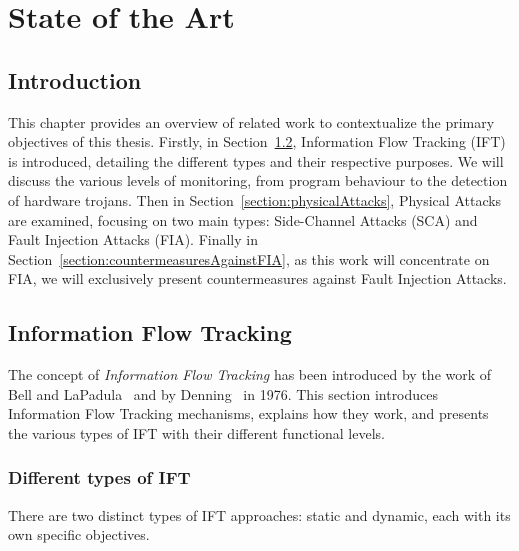 \chapter{State of the Art}
\label{chapter:soa}
\minitoc

\section{Introduction}
This chapter provides an overview of related work to contextualize the primary objectives of this thesis. Firstly, in Section~\ref{section:ift}, Information Flow Tracking (IFT) is introduced, detailing the different types and their respective purposes. We will discuss the various levels of monitoring, from program behaviour to the detection of hardware trojans.
Then in Section~\ref{section:physicalAttacks}, Physical Attacks are examined, focusing on two main types: Side-Channel Attacks (SCA) and Fault Injection Attacks (FIA).
Finally in Section~\ref{section:countermeasuresAgainstFIA}, as this work will concentrate on FIA, we will exclusively present countermeasures against Fault Injection Attacks.

\section{Information Flow Tracking}
\label{section:ift}
The concept of \textit{Information Flow Tracking} has been introduced by the work of Bell and LaPadula~\cite{BLP-76-military} and by Denning~\cite{D-76-commacm} in 1976.
This section introduces Information Flow Tracking mechanisms, explains how they work, and presents the various types of IFT with their different functional levels.
    
\subsection{Different types of IFT}
There are two distinct types of IFT approaches: static and dynamic, each with its own specific objectives.


